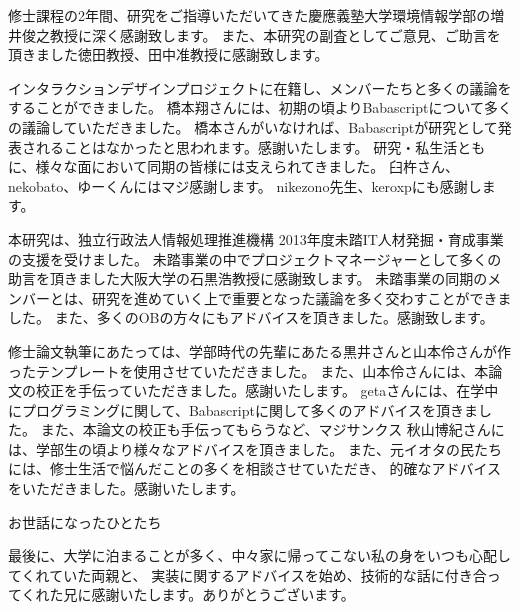 \begin{acknowledgment}

修士課程の2年間、研究をご指導いただいてきた慶應義塾大学環境情報学部の増井俊之教授に深く感謝致します。
また、本研究の副査としてご意見、ご助言を頂きました徳田教授、田中准教授に感謝致します。

インタラクションデザインプロジェクトに在籍し、メンバーたちと多くの議論をすることができました。
橋本翔さんには、初期の頃よりBabascriptについて多くの議論していただきました。
橋本さんがいなければ、Babascriptが研究として発表されることはなかったと思われます。感謝いたします。
研究・私生活ともに、様々な面において同期の皆様には支えられてきました。
臼杵さん、nekobato、ゆーくんにはマジ感謝します。
nikezono先生、keroxpにも感謝します。

本研究は、独立行政法人情報処理推進機構 2013年度未踏IT人材発掘・育成事業の支援を受けました。
未踏事業の中でプロジェクトマネージャーとして多くの助言を頂きました大阪大学の石黒浩教授に感謝致します。
未踏事業の同期のメンバーとは、研究を進めていく上で重要となった議論を多く交わすことができました。
また、多くのOBの方々にもアドバイスを頂きました。感謝致します。

修士論文執筆にあたっては、学部時代の先輩にあたる黒井さんと山本伶さんが作ったテンプレートを使用させていただきました。
また、山本伶さんには、本論文の校正を手伝っていただきました。感謝いたします。
getaさんには、在学中にプログラミングに関して、Babascriptに関して多くのアドバイスを頂きました。
また、本論文の校正も手伝ってもらうなど、マジサンクス
秋山博紀さんには、学部生の頃より様々なアドバイスを頂きました。
また、元イオタの民たちには、修士生活で悩んだことの多くを相談させていただき、
的確なアドバイスをいただきました。感謝いたします。



お世話になったひとたち


最後に、大学に泊まることが多く、中々家に帰ってこない私の身をいつも心配してくれていた両親と、
実装に関するアドバイスを始め、技術的な話に付き合ってくれた兄に感謝いたします。ありがとうございます。



\end{acknowledgment}
